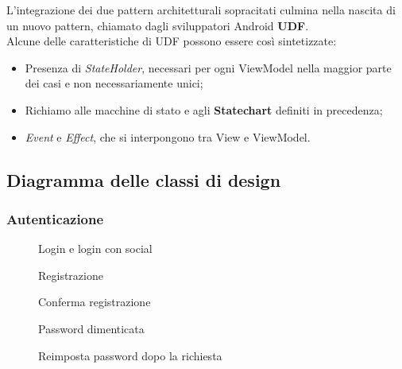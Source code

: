 \documentclass{natourDoc}
\begin{document}
L'integrazione dei due pattern architetturali sopracitati culmina nella nascita di un nuovo pattern, chiamato dagli sviluppatori Android \textbf{UDF}.\\
Alcune delle caratteristiche di UDF possono essere così sintetizzate:
\begin{itemize}
	\item Presenza di \textit{StateHolder}, necessari per ogni ViewModel nella maggior parte dei casi e non necessariamente unici;
	\item Richiamo alle macchine di stato e agli \textbf{Statechart} definiti in precedenza;
	\item \textit{Event} e \textit{Effect}, che si interpongono tra View e ViewModel.
\end{itemize}

\newpage
\subsection{Diagramma delle classi di design}
\subsubsection{Autenticazione}
\begin{figure}[!htbp]
	\centering
	
	\caption{Login e login con social}
\end{figure}
\FloatBarrier

\begin{figure}[!htbp]
	\centering
	
	\caption{Registrazione}
\end{figure}
\FloatBarrier

\begin{figure}[!htbp]
	\centering
	
	\caption{Conferma registrazione}
\end{figure}
\FloatBarrier

\begin{figure}[!htbp]
	\centering
	
	\caption{Password dimenticata}
\end{figure}
\FloatBarrier

\begin{figure}[!htbp]
	\centering
	
	\caption{Reimposta password dopo la richiesta}
\end{figure}
\FloatBarrier
\end{document}
